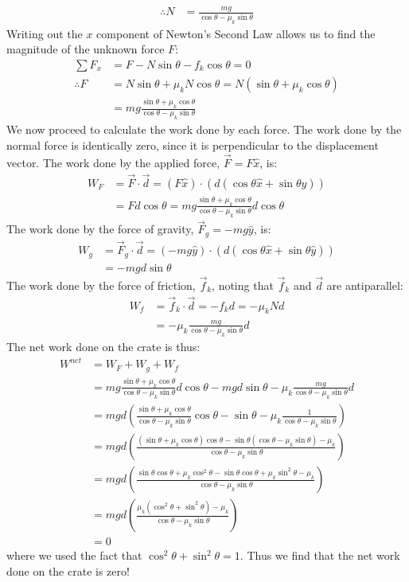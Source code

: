 \begin{example}
\begin{align*}
\therefore N &= \frac{mg}{\cos\theta-\mu_k\sin\theta}
\end{align*}
Writing out the $x$ component of Newton's Second Law allows us to find the magnitude of the unknown force $F$:
\begin{align*}
\sum F_x &= F - N\sin\theta - f_k\cos\theta = 0\\
\therefore F &= N\sin\theta+\mu_kN\cos\theta = N(\sin\theta+\mu_k\cos\theta)\\
&=mg\frac{\sin\theta+\mu_k\cos\theta}{\cos\theta-\mu_k\sin\theta}
\end{align*}
We now proceed to calculate the work done by each force. The work done by the normal force is identically zero, since it is perpendicular to the displacement vector. The work done by the applied force, $\vec F = F\hat x$, is:
\begin{align*}
W_F &= \vec F \cdot \vec d = (F\hat x)\cdot(d (\cos\theta \hat x + \sin\theta \hat y))\\
&=Fd\cos\theta=mg\frac{\sin\theta+\mu_k\cos\theta}{\cos\theta-\mu_k\sin\theta}d\cos\theta
\end{align*}
The work done by the force of gravity, $\vec F_g = -mg \hat y$, is:
\begin{align*}
W_g &= \vec F_g \cdot \vec d = (-mg \hat y)\cdot(d (\cos\theta \hat x + \sin\theta \hat y))\\
&=-mgd\sin\theta
\end{align*}
The work done by the force of friction, $\vec f_k$, noting that $\vec f_k$ and $\vec d$ are antiparallel:
\begin{align*}
W_f &= \vec f_k \cdot \vec d = -f_kd = -\mu_kNd\\
&=-\mu_k\frac{mg}{\cos\theta-\mu_k\sin\theta}d
\end{align*}
The net work done on the crate is thus:
\begin{align*}
W^{net}&=W_F + W_g + W_f\\
&=mg\frac{\sin\theta+\mu_k\cos\theta}{\cos\theta-\mu_k\sin\theta}d\cos\theta-mgd\sin\theta -\mu_k\frac{mg}{\cos\theta-\mu_k\sin\theta}d\\
&=mgd \left(  \frac{\sin\theta+\mu_k\cos\theta}{\cos\theta-\mu_k\sin\theta}\cos\theta - \sin\theta - \mu_k\frac{1}{\cos\theta-\mu_k\sin\theta} \right)\\
&=mgd \left(  \frac{(\sin\theta+\mu_k\cos\theta)\cos\theta - \sin\theta(\cos\theta-\mu_k\sin\theta) - \mu_k}{\cos\theta-\mu_k\sin\theta} \right)\\
&=mgd \left(  \frac{\sin\theta\cos\theta+\mu_k\cos^2\theta - \sin\theta\cos\theta+\mu_k\sin^2\theta - \mu_k}{\cos\theta-\mu_k\sin\theta} \right)\\
&=mgd \left(  \frac{\mu_k(\cos^2\theta+\sin^2\theta) - \mu_k}{\cos\theta-\mu_k\sin\theta} \right)\\
&=0
\end{align*}
where we used the fact that $\cos^2\theta+\sin^2\theta=1$. Thus we find that the net work done on the crate is zero!


\end{example}
